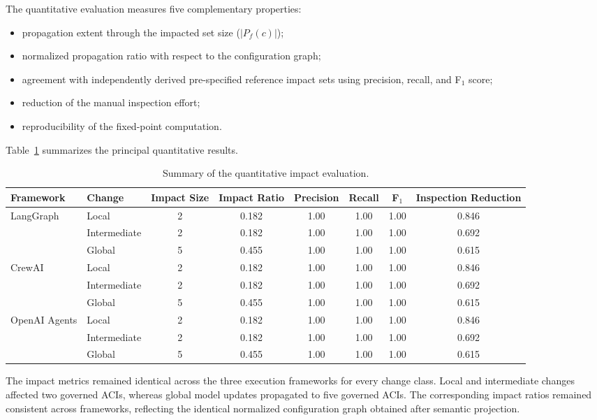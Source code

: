 \documentclass[10pt]{article}
\begin{document}
The quantitative evaluation measures five complementary properties:

\begin{itemize}
	\item propagation extent through the impacted set size ($|P_f(c)|$);
	\item normalized propagation ratio with respect to the configuration graph;
	\item agreement with independently derived pre-specified reference impact sets using precision, recall, and F$_1$ score;
	\item reduction of the manual inspection effort;
	\item reproducibility of the fixed-point computation.
\end{itemize}

Table~\ref{tab:impact_summary} summarizes the principal quantitative results.

\begin{table}[t]
	\centering
	\caption{Summary of the quantitative impact evaluation.}
	\label{tab:impact_summary}
	\small
	\begin{tabular}{llcccccc}
		\toprule
		Framework &
		Change &
		Impact Size &
		Impact Ratio &
		Precision &
		Recall &
		F$_1$ &
		Inspection Reduction
		\\
		\midrule
		LangGraph &
		Local &
		2 &
		0.182 &
		1.00 &
		1.00 &
		1.00 &
		0.846
		\\
		&
		Intermediate &
		2 &
		0.182 &
		1.00 &
		1.00 &
		1.00 &
		0.692
		\\
		&
		Global &
		5 &
		0.455 &
		1.00 &
		1.00 &
		1.00 &
		0.615
		\\
		\midrule
		CrewAI &
		Local &
		2 &
		0.182 &
		1.00 &
		1.00 &
		1.00 &
		0.846
		\\
		&
		Intermediate &
		2 &
		0.182 &
		1.00 &
		1.00 &
		1.00 &
		0.692
		\\
		&
		Global &
		5 &
		0.455 &
		1.00 &
		1.00 &
		1.00 &
		0.615
		\\
		\midrule
		OpenAI Agents &
		Local &
		2 &
		0.182 &
		1.00 &
		1.00 &
		1.00 &
		0.846
		\\
		&
		Intermediate &
		2 &
		0.182 &
		1.00 &
		1.00 &
		1.00 &
		0.692
		\\
		&
		Global &
		5 &
		0.455 &
		1.00 &
		1.00 &
		1.00 &
		0.615
		\\
		\bottomrule
	\end{tabular}
\end{table}

The impact metrics remained identical across the three execution frameworks for every change class. Local and intermediate changes affected two governed ACIs, whereas global model updates propagated to five governed ACIs. The corresponding impact ratios remained consistent across frameworks, reflecting the identical normalized configuration graph obtained after semantic projection. 
\end{document}
